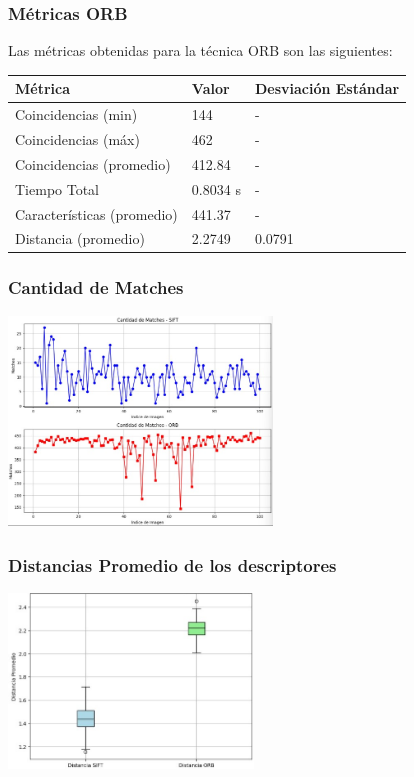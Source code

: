 \documentclass[unnumsec,webpdf,modern,large]{mam-authoring-template}
\theoremstyle{thmstyleone}%
\theoremstyle{thmstyletwo}%
\theoremstyle{thmstylethree}%
\begin{document}
\subsubsection{Métricas ORB}

Las métricas obtenidas para la técnica ORB son las siguientes:

\begin{center}
\begin{tabular}{ | m{7em} | m{1.5cm} | m{1.5cm} | } 
  \hline
  \textbf{Métrica} & \textbf{Valor} & \textbf{Desviación Estándar} \\ 
  \hline
  Coincidencias (min) & 144 & - \\ 
  \hline
  Coincidencias (máx) & 462 & - \\ 
  \hline
  Coincidencias (promedio) & 412.84 & - \\ 
  \hline
  Tiempo Total & 0.8034 s & - \\ 
  \hline
  Características (promedio) & 441.37 & - \\ 
  \hline
  Distancia (promedio) & 2.2749 & 0.0791 \\ 
  \hline
\end{tabular}
\end{center}

\subsubsection{Cantidad de Matches}

\includegraphics[width=7cm]{3.1.jpeg}


\subsubsection{Distancias Promedio de los descriptores}
\includegraphics[width=6.5cm]{3.2.jpeg}
\end{document}
